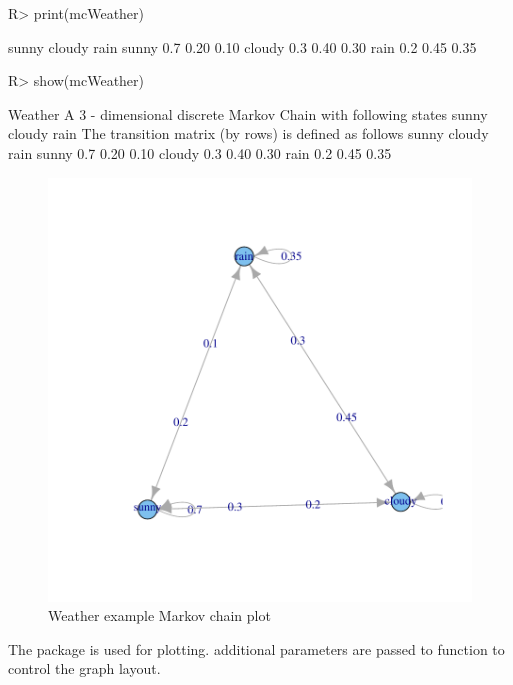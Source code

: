 \documentclass[nojss]{jss}
\begin{document}
\begin{Schunk}
\begin{Sinput}
R> print(mcWeather)
\end{Sinput}
\begin{Soutput}
       sunny cloudy rain
sunny    0.7   0.20 0.10
cloudy   0.3   0.40 0.30
rain     0.2   0.45 0.35
\end{Soutput}
\begin{Sinput}
R> show(mcWeather)
\end{Sinput}
\begin{Soutput}
Weather 
 A  3 - dimensional discrete Markov Chain with following states 
 sunny cloudy rain 
 The transition matrix   (by rows)  is defined as follows 
       sunny cloudy rain
sunny    0.7   0.20 0.10
cloudy   0.3   0.40 0.30
rain     0.2   0.45 0.35
\end{Soutput}
\end{Schunk}

\begin{figure}
\begin{center}
\includegraphics{an_introduction_to_markovchain_package-mcPlot}
\caption{Weather example Markov chain plot}
\label{fig:mcPlot}
\end{center}
\end{figure}

The  package \citep{pkg:igraph} is used for plotting.  additional parameters are passed to  function to control the graph layout.
\end{document}
